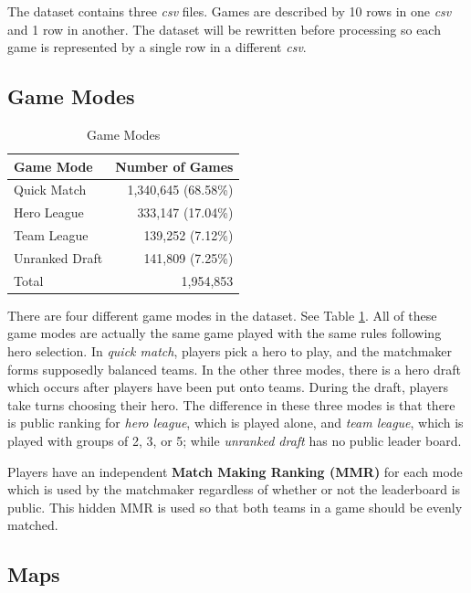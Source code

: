 \documentclass[twoside,twocolumn]{article}
\begin{document}
The dataset contains three \textit{csv} files.  Games are described by 10 rows in one \textit{csv} and 1 row in another.  The dataset will be rewritten before processing so each game is represented by a single row in a different \textit{csv}.

\subsection{Game Modes}

\begin{table}[h]
\caption{Game Modes}
\label{table:modes}
\centering
\begin{tabular}{lr}
\toprule
Game Mode & Number of Games \\
\midrule
Quick Match & 1,340,645  (68.58\%) \\
Hero League  & 333,147  (17.04\%) \\
Team League & 139,252  (7.12\%) \\
Unranked Draft & 141,809  (7.25\%) \\
\midrule
Total & 1,954,853 \\
\bottomrule
\end{tabular}
\end{table}

There are four different game modes in the dataset. See Table \ref{table:modes}.  All of these game modes are actually the same game played with the same rules following hero selection.  In \textit{quick match}, players pick a hero to play, and the matchmaker forms supposedly balanced teams.  In the other three modes, there is a hero draft which occurs after players have been put onto teams.  During the draft, players take turns choosing their hero.  The difference in these three modes is that there is public ranking for \textit{hero league}, which is played alone, and \textit{team league}, which is played with groups of 2, 3, or 5; while \textit{unranked draft} has no public leader board.

Players have an independent \textbf{Match Making Ranking (MMR)} for each mode which is used by the matchmaker regardless of whether or not the leaderboard is public.  This hidden MMR is used so that both teams in a game should be evenly matched.

\subsection{Maps}
\end{document}
